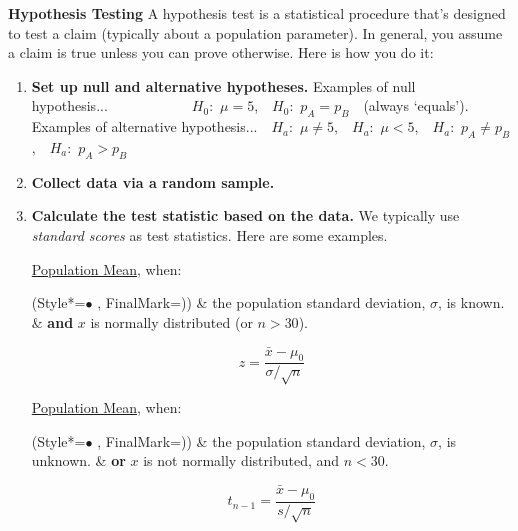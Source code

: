 \vspace{+13.0mm}
\textbf{Hypothesis Testing}
\newline
A hypothesis test is a statistical procedure that's designed to test a claim (typically about a population parameter).
In general, you assume a claim is true unless you can prove otherwise.
Here is how you do it:
\vspace{-3.5mm}
\begin{enumerate}
\item
\textbf{Set up null and alternative hypotheses.}
\newline
Examples of null hypothesis...~~~~~~~~~~~~$H_0$:~$\mu = 5$,~~$H_0$:~$p_A = p_B$~~(always `equals').
\newline
Examples of alternative hypothesis...~~$H_a$:~$\mu \neq 5$,~~$H_a$:~$\mu < 5$,~~$H_a$:~$p_A \neq p_B$,~~$H_a$:~$p_A > p_B$
\item
\textbf{Collect data via a random sample.}
\item
\textbf{Calculate the test statistic based on the data.}
\newline
We typically use \textit{standard scores} as test statistics.
Here are some examples.

\underline{Population Mean}, when:
\begin{easylist}[itemize]
\ListProperties(Style*=$\bullet$ , FinalMark={)})
\vspace{-2.0mm}
& the population standard deviation, $\sigma$, is known.
\vspace{-3.5mm}
& \textbf{and} $x$ is normally distributed (or $n>30$).
\end{easylist}
% 
\vspace{-5.0mm}
\begin{equation}
z = \frac{\bar{x} - \mu_0}{\sigma / \sqrt{n}}
\end{equation}

\underline{Population Mean}, when:
\begin{easylist}[itemize]
\ListProperties(Style*=$\bullet$ , FinalMark={)})
\vspace{-2.0mm}
& the population standard deviation, $\sigma$, is unknown.
\vspace{-3.5mm}
& \textbf{or} $x$ is not normally distributed, and $n < 30$.
\end{easylist}
% 
\vspace{-5.0mm}
\begin{equation}
t_{n-1} = \frac{\bar{x} - \mu_0}{s / \sqrt{n}}
\end{equation}


\end{enumerate}
